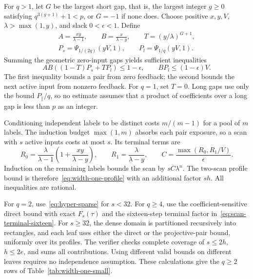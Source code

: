 For $q>1$, let $G$ be the largest short gap, that is, the largest
integer $g\ge0$ satisfying $q^{3(g+1)}+1<p$, or $G=-1$ if none does.
Choose positive $x,y,V$, $\lambda>\max(1,y)$, and slack
$0<\epsilon<1$. Define
\begin{gather*}
 A=\frac{xy}{\lambda-1},\qquad B=\frac{x}{\lambda-y},\qquad
 T=(y/\lambda)^{G+1},\\
 P_s=\Psi_{1/(2q)}(yV,1),\qquad P_l=\Psi_{1/q}(yV,1).
\end{gather*}
Summing the geometric zero-input gaps yields sufficient inequalities
\[
 AB((1-T)P_s+TP_l)\le1-\epsilon,\qquad
 BP_l\le(1-\epsilon)V.
\]
The first inequality bounds a pair from zero feedback; the second
bounds the next active input from nonzero feedback. For $q=1$, set
$T=0$. Long gaps use only the bound $P_\parallel/q$, so no estimate
assumes that a product of coefficients over a long gap is less than $p$
as an integer.

Conditioning independent labels to be distinct costs $m/(m-1)$ for
a pool of $m$ labels. The induction budget $\max(1,m)$ absorbs each
pair exposure, so a scan with $s$ active inputs costs at most $s$.
Its terminal terms are
\[
 R_0=\frac\lambda{\lambda-1}\left(1+\frac{xy}{\lambda-y}\right),
 \qquad R_1=\frac\lambda{\lambda-y},\qquad
 C=\frac{\max(R_0,R_1/V)}\epsilon.
\]
Induction on the remaining labels bounds the scan by $sC\lambda^n$.
The two-scan profile bound is therefore~\eqref{eq:width-one-profile}
with an additional factor $sh$. All inequalities are rational.

For $q=2$, use~\eqref{eq:hyper-sparse} for $s<32$. For $q\ge4$, use
the coefficient-sensitive direct bound with exact $F_s(\tau)$ and the
sixteen-step terminal factor in~\eqref{eq:scan-terminal-sixteen}.
For $s\ge32$, the dense domain is partitioned recursively into
rectangles, and each leaf uses either the direct or the projective-pair
bound, uniformly over its profiles. The verifier checks complete coverage
of $s\le2h$, $h\le2e$, and sums all contributions. Using different
valid bounds on different leaves requires no independence assumption.
These calculations give the $q\ge2$ rows of Table~\ref{tab:width-one-small}.
